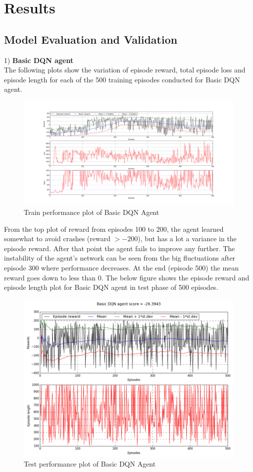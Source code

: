 \documentclass{article}
\begin{document}
\section{Results}
\subsection*{Model Evaluation and Validation}
1) \textbf{Basic DQN agent}\\
The following plots show the variation of episode reward, total episode loss and episode length for each of the 500 training episodes conducted for Basic DQN agent.
\begin{figure}[H]
	\caption{Train performance plot of Basic DQN Agent}
	\centering
	\includegraphics[width=15cm,trim={0 0 0 0},clip]{img/basicdqn_train}
\end{figure}
From the top plot of reward from episodes 100 to 200, the agent learned somewhat to avoid crashes (reward $> -200$), but has a lot a variance in the episode reward. After that point the agent fails to improve any further. The instability of the agent's network can be seen from the big fluctuations after episode 300 where performance decreases. At the end (episode 500) the mean reward goes down to less than 0.
The below figure shows the episode reward and episode length plot for Basic DQN agent in test phase of 500 episodes.
\begin{figure}[H]
	\caption{Test performance plot of Basic DQN Agent}
	\centering
	\includegraphics[width=13cm,trim={0 0 0 0},clip]{img/basicdqn}
\end{figure}
\end{document}
